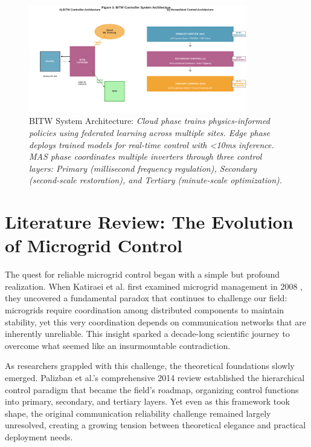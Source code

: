 \documentclass[12pt]{article}
\begin{document}
\begin{figure}[H]
\centering
\includegraphics[width=0.85\textwidth]{figure3_system_architecture.pdf}
\caption{BITW System Architecture: \textit{Cloud phase trains physics-informed policies using federated learning across multiple sites. Edge phase deploys trained models for real-time control with <10ms inference. MAS phase coordinates multiple inverters through three control layers: Primary (millisecond frequency regulation), Secondary (second-scale restoration), and Tertiary (minute-scale optimization).}}
\end{figure}

\section{Literature Review: The Evolution of Microgrid Control}

The quest for reliable microgrid control began with a simple but profound realization. When Katiraei et al. first examined microgrid management in 2008 \cite{katiraei2008}, they uncovered a fundamental paradox that continues to challenge our field: microgrids require coordination among distributed components to maintain stability, yet this very coordination depends on communication networks that are inherently unreliable. This insight sparked a decade-long scientific journey to overcome what seemed like an insurmountable contradiction.

As researchers grappled with this challenge, the theoretical foundations slowly emerged. Palizban et al.'s comprehensive 2014 review \cite{palizban2014} established the hierarchical control paradigm that became the field's roadmap, organizing control functions into primary, secondary, and tertiary layers. Yet even as this framework took shape, the original communication reliability challenge remained largely unresolved, creating a growing tension between theoretical elegance and practical deployment needs.
\end{document}
